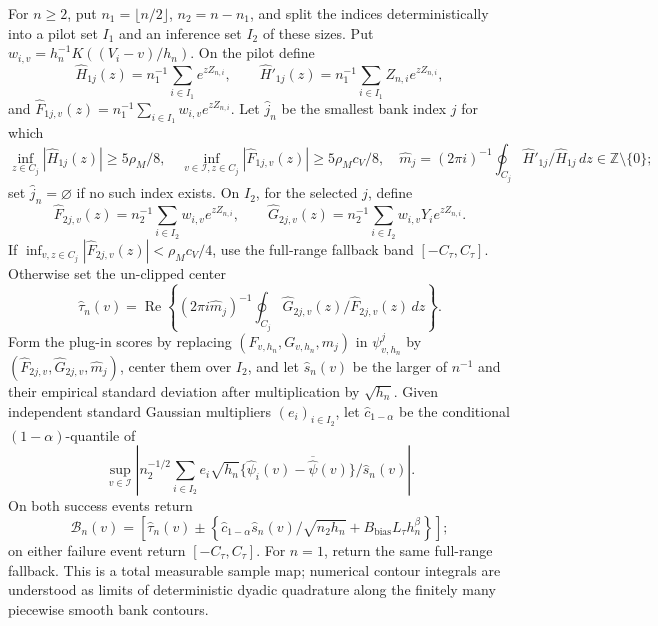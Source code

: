 For \(n\ge2\), put \(n_1=\lfloor n/2\rfloor\), \(n_2=n-n_1\), and split the indices deterministically into a pilot set \(I_1\) and an inference set \(I_2\) of these sizes.  Put \(w_{i,v}=h_n^{-1}K((V_i-v)/h_n)\).  On the pilot define
\[
 \widehat H_{1j}(z)=n_1^{-1}\sum_{i\in I_1}e^{zZ_{n,i}},\qquad
 \widehat H'_{1j}(z)=n_1^{-1}\sum_{i\in I_1}Z_{n,i}e^{zZ_{n,i}},
\]
and \(\widehat F_{1j,v}(z)=n_1^{-1}\sum_{i\in I_1}w_{i,v}e^{zZ_{n,i}}\).  Let \(\widehat j_n\) be the smallest bank index \(j\) for which
\[
 \inf_{z\in C_j}|\widehat H_{1j}(z)|\ge5\rho_M/8,
 \quad
 \inf_{v\in\mathcal I,z\in C_j}|\widehat F_{1j,v}(z)|\ge5\rho_Mc_V/8,
 \quad
 \widehat m_j=(2\pi i)^{-1}\oint_{C_j}\widehat H'_{1j}/\widehat H_{1j}\,dz\in\mathbb Z\setminus\{0\};
\]
set \(\widehat j_n=\varnothing\) if no such index exists.  On \(I_2\), for the selected \(j\), define
\[
 \widehat F_{2j,v}(z)=n_2^{-1}\sum_{i\in I_2}w_{i,v}e^{zZ_{n,i}},\qquad
 \widehat G_{2j,v}(z)=n_2^{-1}\sum_{i\in I_2}w_{i,v}Y_i e^{zZ_{n,i}}.
\]
If \(\inf_{v,z\in C_j}|\widehat F_{2j,v}(z)|<\rho_Mc_V/4\), use the full-range fallback band \([-C_\tau,C_\tau]\).  Otherwise set the un-clipped center
\[
 \widehat\tau_n(v)=\operatorname{Re}\left\{(2\pi i\widehat m_j)^{-1}\oint_{C_j}\widehat G_{2j,v}(z)/\widehat F_{2j,v}(z)\,dz\right\}.
\]
Form the plug-in scores by replacing \((F_{v,h_n},G_{v,h_n},m_j)\) in \(\psi^j_{v,h_n}\) by \((\widehat F_{2j,v},\widehat G_{2j,v},\widehat m_j)\), center them over \(I_2\), and let \(\widehat s_n(v)\) be the larger of \(n^{-1}\) and their empirical standard deviation after multiplication by \(\sqrt{h_n}\).  Given independent standard Gaussian multipliers \((e_i)_{i\in I_2}\), let \(\widehat c_{1-\alpha}\) be the conditional \((1-\alpha)\)-quantile of
\[
 \sup_{v\in\mathcal I}\left|n_2^{-1/2}\sum_{i\in I_2}e_i\sqrt{h_n}\{\widehat\psi_{i}(v)-\overline{\widehat\psi}(v)\}/\widehat s_n(v)\right|.
\]
On both success events return
\[
 \mathcal B_n(v)=\left[\widehat\tau_n(v)\pm\left\{\widehat c_{1-\alpha}\widehat s_n(v)/\sqrt{n_2h_n}+B_{\mathrm{bias}}L_\tau h_n^\beta\right\}\right];
\]
on either failure event return \([-C_\tau,C_\tau]\).  For \(n=1\), return the same full-range fallback.  This is a total measurable sample map; numerical contour integrals are understood as limits of deterministic dyadic quadrature along the finitely many piecewise smooth bank contours.